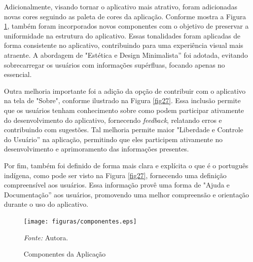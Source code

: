 Adicionalmente, visando tornar o aplicativo mais atrativo, foram adicionadas novas cores seguindo as paleta de cores da aplicação. Conforme mostra a Figura \ref{fig26}, também foram incorporados novos componentes com o objetivo de preservar a uniformidade na estrutura do aplicativo.
Essas tonalidades foram aplicadas de forma consistente no aplicativo, contribuindo para uma experiência visual mais atraente. A abordagem de "Estética e Design Minimalista'' foi adotada, evitando sobrecarregar os usuários com informações supérfluas, focando apenas no essencial.

Outra melhoria importante foi a adição da opção de contribuir com o aplicativo na tela de "Sobre", conforme ilustrado na Figura \ref{fig27}. Essa inclusão permite que os usuários tenham conhecimento sobre como podem participar ativamente do desenvolvimento do aplicativo, 
fornecendo \textit{feedback}, relatando erros e contribuindo com sugestões. Tal melhoria permite maior "Liberdade e Controle do Usuário'' na aplicação, permitindo que eles participem ativamente no desenvolvimento e aprimoramento 
das informações presentes.

Por fim, também foi definido de forma mais clara e explícita o que é o português indígena, como pode ser visto na Figura \ref{fig27}, fornecendo uma definição compreensível aos usuários. Essa informação provê uma forma de "Ajuda e Documentação'' aos usuários, promovendo uma melhor 
compreensão e orientação durante o uso do aplicativo.

\begin{figure}[h!]
	\centering
	\caption{Componentes da Aplicação}
	\begin{adjustbox}{center}
		\texttt{[image: figuras/componentes.eps]}
	\end{adjustbox}
	\begin{tablenotes}[flushleft]
		\centering
		\item \textit{Fonte:} Autora.
	\end{tablenotes}
	\label{fig26}
\end{figure}

